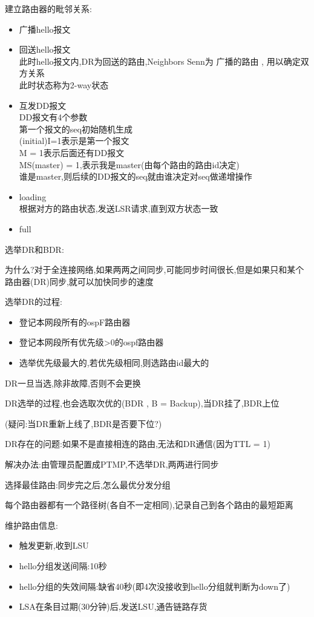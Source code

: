\documentclass[UTF8,a4paper]{ctexart}
\begin{document}
建立路由器的毗邻关系:
\begin{itemize}
  \item 广播hello报文
  \item 回送hello报文\\
  此时hello报文内,DR为回送的路由,Neighbors Senn为 广播的路由 , 用以确定双方关系\\
  此时状态称为2-way状态
  \item 互发DD报文\\
  DD报文有4个参数\\
  第一个报文的seq初始随机生成\\
  (initial)I=1表示是第一个报文\\
  M = 1表示后面还有DD报文\\
  MS(master) = 1,表示我是master(由每个路由的路由id决定)\\
  谁是master,则后续的DD报文的seq就由谁决定对seq做递增操作
  \item loading\\
  根据对方的路由状态,发送LSR请求,直到双方状态一致
  \item full
\end{itemize}

选举DR和BDR:

为什么?对于全连接网络,如果两两之间同步,可能同步时间很长,但是如果只和某个路由器(DR)同步,就可以加快同步的速度

选举DR的过程:
\begin{itemize}
  \item 登记本网段所有的ospF路由器
  \item 登记本网段所有优先级>0的ospf路由器
  \item 选举优先级最大的,若优先级相同,则选路由id最大的
\end{itemize}

DR一旦当选,除非故障,否则不会更换

DR选举的过程,也会选取次优的(BDR , B = Backup),当DR挂了,BDR上位

(疑问:当DR重新上线了,BDR是否要下位?)

DR存在的问题:如果不是直接相连的路由,无法和DR通信(因为TTL = 1)

解决办法:由管理员配置成PTMP,不选举DR,两两进行同步

选择最佳路由:同步完之后,怎么最优分发分组

每个路由器都有一个路径树(各自不一定相同),记录自己到各个路由的最短距离

维护路由信息:
\begin{itemize}
  \item 触发更新,收到LSU
  \item hello分组发送间隔:10秒
  \item hello分组的失效间隔:缺省40秒(即4次没接收到hello分组就判断为down了)
  \item LSA在条目过期(30分钟)后,发送LSU,通告链路存货
\end{itemize}
\end{document}
